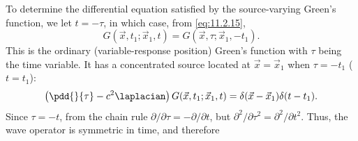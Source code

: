To determine the differential equation satisfied by the source-varying Green's function, we let $t = -\tau$, in which case, from \eqref{eq:11.2.15},
\[
G(\vec{x},t_1;\vec{x}_1,t) = G(\vec{x},\tau;\vec{x}_1,-t_1).
\]
This is the ordinary (variable-response position) Green's function with $\tau$ being the time variable.  It has a concentrated source located at $\vec{x} = \vec{x}_1$ when $\tau = -t_1$ ($t = t_1$):
\[
\left(\pdd{}{\tau} - c^2\laplacian\right) G(\vec{x},t_1;\vec{x}_1,t) = \delta(\vec{x} - \vec{x}_1)\delta(t - t_1).
\]
Since $\tau = -t$, from the chain rule $\partial/\partial\tau = -\partial/\partial t$, but $\partial^2/\partial\tau^2 = \partial^2/\partial t^2$.  Thus, the wave operator is symmetric in time, and therefore

